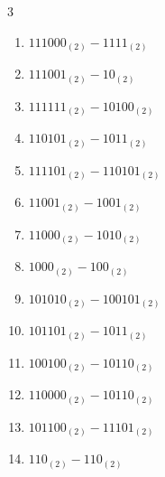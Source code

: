 \begin{multicols}{3}
\begin{enumerate}
  \item $111000_{(2)} - 1111_{(2)}$


  \item $111001_{(2)} - 10_{(2)}$


  \item $111111_{(2)} - 10100_{(2)}$


  \item $110101_{(2)} - 1011_{(2)}$


  \item $111101_{(2)} - 110101_{(2)}$


  \item $11001_{(2)} - 1001_{(2)}$


  \item $11000_{(2)} - 1010_{(2)}$


\columnbreak %

  \item $1000_{(2)} - 100_{(2)}$


  \item $101010_{(2)} - 100101_{(2)}$


  \item $101101_{(2)} - 1011_{(2)}$


  \item $100100_{(2)} - 10110_{(2)}$


  \item $110000_{(2)} - 10110_{(2)}$


  \item $101100_{(2)} - 11101_{(2)}$


  \item $110_{(2)} - 110_{(2)}$


\end{enumerate}
\end{multicols}
